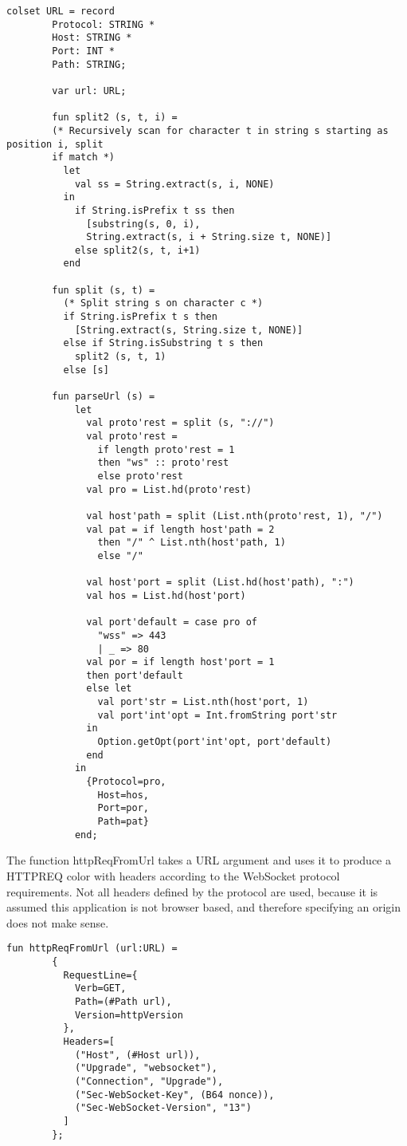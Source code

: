 		\begin{lstlisting}[label=lst:url,caption=URL Declarations,gobble=2]
		colset URL = record
		Protocol: STRING *
		Host: STRING *
		Port: INT *
		Path: STRING;
		
		var url: URL;
		
		fun split2 (s, t, i) =
		(* Recursively scan for character t in string s starting as position i, split
		if match *)
		  let
		    val ss = String.extract(s, i, NONE) 
		  in 
		    if String.isPrefix t ss then
		      [substring(s, 0, i), 
		      String.extract(s, i + String.size t, NONE)]
		    else split2(s, t, i+1)
		  end
		
		fun split (s, t) = 
		  (* Split string s on character c *)
		  if String.isPrefix t s then
		    [String.extract(s, String.size t, NONE)]
		  else if String.isSubstring t s then
		    split2 (s, t, 1)
		  else [s]
		
		fun parseUrl (s) = 
			let
			  val proto'rest = split (s, "://")
			  val proto'rest = 
			    if length proto'rest = 1 
			    then "ws" :: proto'rest 
			    else proto'rest 
			  val pro = List.hd(proto'rest)
			
			  val host'path = split (List.nth(proto'rest, 1), "/")
			  val pat = if length host'path = 2
			    then "/" ^ List.nth(host'path, 1)
			    else "/"
			  
			  val host'port = split (List.hd(host'path), ":")
			  val hos = List.hd(host'port)
			
			  val port'default = case pro of
			    "wss" => 443
			    | _ => 80
			  val por = if length host'port = 1 
			  then port'default
			  else let
			    val port'str = List.nth(host'port, 1)
			    val port'int'opt = Int.fromString port'str
			  in
			    Option.getOpt(port'int'opt, port'default)
			  end
			in
			  {Protocol=pro, 
			    Host=hos, 
			    Port=por, 
			    Path=pat}
			end;
		\end{lstlisting}
		
		The function httpReqFromUrl takes a URL argument and uses it to produce a
		HTTPREQ color with headers according to the WebSocket protocol requirements.
		Not all headers defined by the protocol are used, because it is assumed this
		application is not browser based, and therefore specifying an origin does not
		make sense.
		
		\begin{lstlisting}[label=lst:httpReqFromUrl,caption=httpReqFromUrl,gobble=2]
		fun httpReqFromUrl (url:URL) = 
		{
		  RequestLine={
		    Verb=GET, 
		    Path=(#Path url),
		    Version=httpVersion
		  },
		  Headers=[
		    ("Host", (#Host url)),
		    ("Upgrade", "websocket"),
		    ("Connection", "Upgrade"),
		    ("Sec-WebSocket-Key", (B64 nonce)),
		    ("Sec-WebSocket-Version", "13")
		  ]
		};
		\end{lstlisting}
		
